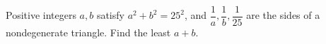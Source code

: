 Positive integers $a,b$ satisfy $a^2+b^2=25^2$, and $\dfrac{1}{a},\dfrac{1}{b},\dfrac{1}{25}$ are the sides of a nondegenerate triangle. Find the least $a+b$.
